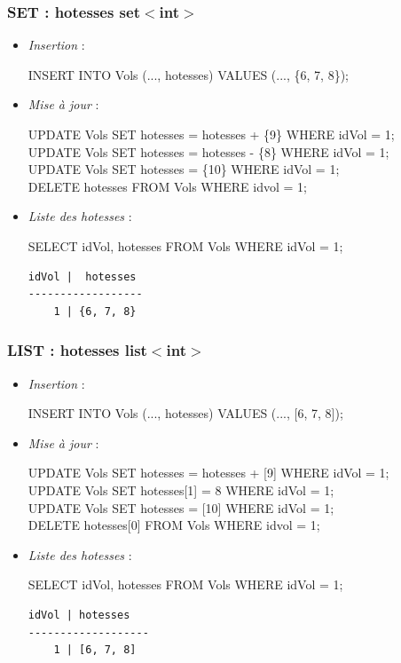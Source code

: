 \begin{frame}[fragile]
\frametitle{SET : hotesses set$<$int$>$}
\begin{itemize}
	\item \textit{Insertion} :\color{fondCnamGris3}

	\footnotesize
	INSERT INTO Vols (..., hotesses) VALUES (..., \{6, 7, 8\});
	\normalsize\color{black}

	\item \textit{Mise à jour} :\color{fondCnamGris3}
	
	\footnotesize
	UPDATE Vols SET hotesses = hotesses + \{9\} WHERE idVol = 1;\\
	UPDATE Vols SET hotesses = hotesses - \{8\} WHERE idVol = 1;\\
	UPDATE Vols SET hotesses = \{10\} WHERE idVol = 1;\\
	DELETE hotesses FROM Vols WHERE idvol = 1; 
	\normalsize\color{black}

	\item \textit{Liste des hotesses} :\color{fondCnamGris3}

	\footnotesize
	SELECT idVol, hotesses FROM Vols WHERE idVol = 1; 
	\normalsize\color{fondCnamGris2}
	\scriptsize
\begin{verbatim}
idVol |  hotesses
------------------
    1 | {6, 7, 8}
\end{verbatim}
\end{itemize}
\end{frame}


\begin{frame}[fragile]
	\frametitle{LIST : hotesses list$<$int$>$}
	\begin{itemize}
		\item \textit{Insertion} :\color{fondCnamGris3}
		
		\footnotesize
		INSERT INTO Vols (..., hotesses) VALUES (..., [6, 7, 8]);
		\normalsize\color{black}
		
		\item \textit{Mise à jour} :\color{fondCnamGris3}
		
		\footnotesize
		UPDATE Vols SET hotesses = hotesses + [9] WHERE idVol = 1;\\
		UPDATE Vols SET hotesses[1] = 8 WHERE idVol = 1;\\
		UPDATE Vols SET hotesses = [10] WHERE idVol = 1;\\
		DELETE hotesses[0] FROM Vols WHERE idvol = 1; 
		\normalsize\color{black}
		
		\item \textit{Liste des hotesses} :\color{fondCnamGris3}
		
		\footnotesize
	SELECT idVol, hotesses FROM Vols WHERE idVol = 1; 
	\normalsize\color{fondCnamGris2}
	\scriptsize
\begin{verbatim}
idVol | hotesses
-------------------
    1 | [6, 7, 8]
\end{verbatim}
	\end{itemize}
\end{frame}

